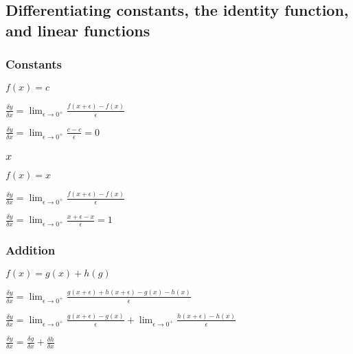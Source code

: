 
\subsection{Differentiating constants, the identity function, and linear functions}

\subsubsection{Constants}

$f(x)=c$

$\frac{\delta y}{\delta x}=\lim_{\epsilon \rightarrow 0^+}\frac{f(x+\epsilon )-f(x)}{\epsilon }$

$\frac{\delta y}{\delta x}=\lim_{\epsilon \rightarrow 0^+}\frac{c-c}{\epsilon }=0$

\subsubsection{\(x\)}

$f(x)=x$

$\frac{\delta y}{\delta x}=\lim_{\epsilon \rightarrow 0^+}\frac{f(x+\epsilon )-f(x)}{\epsilon }$

$\frac{\delta y}{\delta x}=\lim_{\epsilon \rightarrow 0^+}\frac{x+\epsilon -x}{\epsilon }=1$
\subsubsection{Addition}

$f(x)=g(x)+h(g)$

$\frac{\delta y}{\delta x}=\lim_{\epsilon \rightarrow 0^+}\frac{g(x+\epsilon )+h(x+\epsilon )-g(x)-h(x)}{\epsilon }$

$\frac{\delta y}{\delta x}=\lim_{\epsilon \rightarrow 0^+}\frac{g(x+\epsilon )-g(x)}{\epsilon }+\lim_{\epsilon \rightarrow 0^+}\frac{h(x+\epsilon )-h(x)}{\epsilon }$

$\frac{\delta y}{\delta x}=\frac{\delta g}{\delta x}+\frac{\delta h}{\delta x}$

